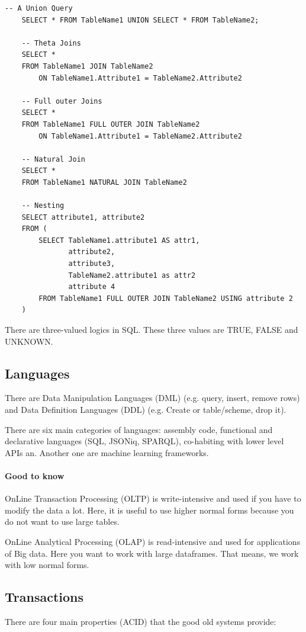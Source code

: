 \begin{lstlisting}[style=sql, caption={SQL code examples}, label={lst:SQLExamples1}]
    -- A Union Query
    SELECT * FROM TableName1 UNION SELECT * FROM TableName2;

    -- Theta Joins
    SELECT *
    FROM TableName1 JOIN TableName2
        ON TableName1.Attribute1 = TableName2.Attribute2

    -- Full outer Joins
    SELECT *
    FROM TableName1 FULL OUTER JOIN TableName2
        ON TableName1.Attribute1 = TableName2.Attribute2

    -- Natural Join
    SELECT *
    FROM TableName1 NATURAL JOIN TableName2

    -- Nesting
    SELECT attribute1, attribute2
    FROM (
        SELECT TableName1.attribute1 AS attr1,
               attribute2,
               attribute3,
               TableName2.attribute1 as attr2
               attribute 4
        FROM TableName1 FULL OUTER JOIN TableName2 USING attribute 2
    )
\end{lstlisting}

There are three-valued logics in SQL. These three values are TRUE, FALSE and UNKNOWN.

\subsection{Languages}
There are Data Manipulation Languages (DML) (e.g. query, insert, remove rows) and Data Definition Languages (DDL) (e.g. Create or table/scheme, drop it).

There are six main categories of languages: assembly code, functional and declarative languages (SQL, JSONiq, SPARQL), co-habiting with lower level APIs an. Another one are machine learning frameworks.

\paragraph{Good to know}
OnLine Transaction Processing (OLTP) is write-intensive and used if you have to modify the data a lot. Here, it is useful to use higher normal forms because you do not want to use large tables.

OnLine Analytical Processing (OLAP) is read-intensive and used for applications of Big data. Here you want to work with large dataframes. That means, we work with low normal forms.


\subsection{Transactions}
There are four main properties (ACID) that the good old systems provide:

